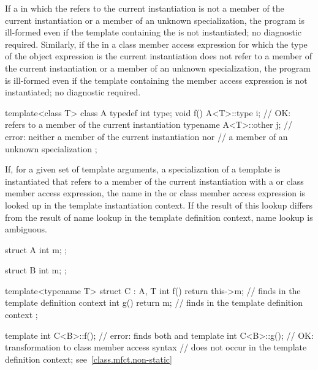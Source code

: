 \pnum
If a  in which the 
refers to the current instantiation is not a member of the current instantiation
or a member of an unknown specialization, the program is ill-formed even if the
template containing the  is not instantiated; no
diagnostic required. Similarly, if the  in a class
member access expression for which the type of the object expression is the
current instantiation does not refer to a member of the current instantiation
or a member of an unknown specialization, the program is ill-formed even if the
template containing the member access expression is not instantiated; no diagnostic
required.
\begin{example}
\begin{codeblock}
template<class T> class A {
  typedef int type;
  void f() {
    A<T>::type i;               // OK: refers to a member of the current instantiation
    typename A<T>::other j;     // error: neither a member of the current instantiation nor
                                // a member of an unknown specialization
  }
};
\end{codeblock}
\end{example}

\pnum
If, for a given set of template arguments, a specialization of a template is
instantiated that refers to a member of the current instantiation with a
 or class member access expression, the name in the
 or class member access expression is looked up in the
template instantiation context. If the result of this lookup differs from the
result of name lookup in the template definition context, name lookup is
ambiguous.
\begin{example}
\begin{codeblock}
struct A {
  int m;
};

struct B {
  int m;
};

template<typename T>
struct C : A, T {
  int f() { return this->m; }   // finds  in the template definition context
  int g() { return m; }         // finds  in the template definition context
};

template int C<B>::f();     // error: finds both  and 
template int C<B>::g();     // OK: transformation to class member access syntax
                            // does not occur in the template definition context; see~\ref{class.mfct.non-static}
\end{codeblock}
\end{example}

